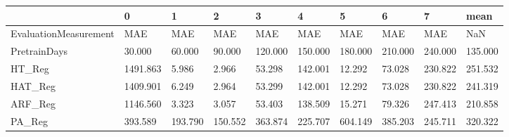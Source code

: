 \begin{tabular}{llllllllll}
\toprule
{} &        0 &       1 &       2 &       3 &       4 &       5 &       6 &       7 &    mean \\
\midrule
EvaluationMeasurement &      MAE &     MAE &     MAE &     MAE &     MAE &     MAE &     MAE &     MAE &     NaN \\
PretrainDays          &   30.000 &  60.000 &  90.000 & 120.000 & 150.000 & 180.000 & 210.000 & 240.000 & 135.000 \\
HT\_Reg                & 1491.863 &   5.986 &   2.966 &  53.298 & 142.001 &  12.292 &  73.028 & 230.822 & 251.532 \\
HAT\_Reg               & 1409.901 &   6.249 &   2.964 &  53.299 & 142.001 &  12.292 &  73.028 & 230.822 & 241.319 \\
ARF\_Reg               & 1146.560 &   3.323 &   3.057 &  53.403 & 138.509 &  15.271 &  79.326 & 247.413 & 210.858 \\
PA\_Reg                &  393.589 & 193.790 & 150.552 & 363.874 & 225.707 & 604.149 & 385.203 & 245.711 & 320.322 \\
\bottomrule
\end{tabular}

